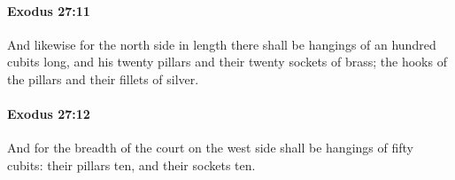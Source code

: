 		\paragraph{Exodus 27:11} %
			\label{EXODUS-27-11}

			And likewise for the north side in length there shall be hangings of an hundred cubits long, and his twenty pillars and their twenty sockets of brass; the hooks of the pillars and their fillets of silver.


		\paragraph{Exodus 27:12} %
			\label{EXODUS-27-12}

			And for the breadth of the court on the west side shall be hangings of fifty cubits: their pillars ten, and their sockets ten.


